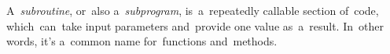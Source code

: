 \label{subroutine}
\mbox{A \textit{subroutine}}, or~also \mbox{a \textit{subprogram},} is~a~repeatedly callable section of~code, which~can~take input parameters and~provide one value as~a~result.
In~other words, it's a~common name for~functions and~methods.
\newpage

